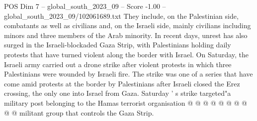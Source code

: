 \begin{textsample}{POS Dim 7 – global\_south\_2023\_09 – Score -1.00 – global\_south\_2023\_09/102061689.txt}
They include, on the Palestinian side, combatants as well as civilians and, on the Israeli side, mainly civilians including minors and three members of the Arab minority.
In recent days, unrest has also surged in the Israeli-blockaded Gaza Strip, with Palestinians holding daily protests that have turned violent along the border with Israel.
On Saturday, the Israeli army carried out a drone strike after violent protests in which three Palestinians were wounded by Israeli fire.
The strike was one of a series that have come amid protests at the border by Palestinians after Israeli closed the Erez crossing, the only one into Israel from Gaza.
Saturday ' s strike targeted"a military post belonging to the Hamas terrorist organisation @ @ @ @ @ @ @ @ @ @ militant group that controls the Gaza Strip.

\end{textsample}
